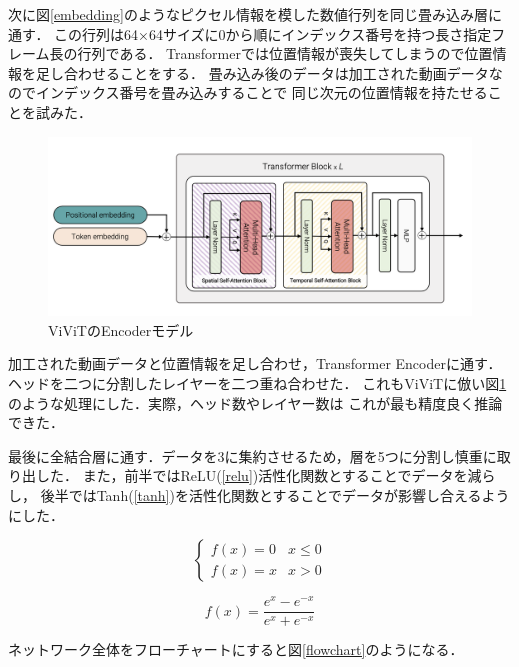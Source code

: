 次に図\ref{embedding}のようなピクセル情報を模した数値行列を同じ畳み込み層に通す．
この行列は64×64サイズに0から順にインデックス番号を持つ長さ指定フレーム長の行列である．
Transformerでは位置情報が喪失してしまうので位置情報を足し合わせることをする．
畳み込み後のデータは加工された動画データなのでインデックス番号を畳み込みすることで
同じ次元の位置情報を持たせることを試みた．
\clearpage

\begin{figure}[t]
  \begin{center}
    \includegraphics[width=130mm]{images/quote/encoder.png}
  \end{center}
  \caption{ViViTのEncoderモデル}
  \label{encoder}
\end{figure}

加工された動画データと位置情報を足し合わせ，Transformer Encoderに通す．
ヘッドを二つに分割したレイヤーを二つ重ね合わせた．
これもViViTに倣い図\ref{encoder}のような処理にした．実際，ヘッド数やレイヤー数は
これが最も精度良く推論できた．

最後に全結合層に通す．データを3に集約させるため，層を5つに分割し慎重に取り出した．
また，前半ではReLU(\ref{relu})活性化関数とすることでデータを減らし，
後半ではTanh(\ref{tanh})を活性化関数とすることでデータが影響し合えるようにした．

\begin{equation}
  \left\{
    \begin{array}{ll}
      f(x) = 0 & x \leq 0 \\
      f(x) = x & x > 0
    \end{array}
  \right.
  \label{relu}
\end{equation}

\begin{equation}
  f(x) = \frac{e^x - e^{-x}}{e^x + e^{-x}}
  \label{tanh}
\end{equation}

ネットワーク全体をフローチャートにすると図\ref{flowchart}のようになる．

